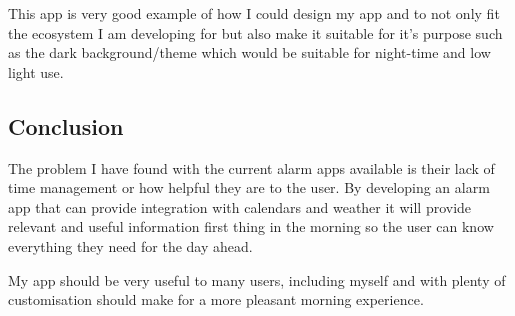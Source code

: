 This app is very good example of how I could design my app and to not
only fit the ecosystem I am developing for but also make it suitable for
it's purpose such as the dark background/theme which would be suitable
for night-time and low light use.

\subsection{Conclusion}\label{conclusion}

The problem I have found with the current alarm apps available is their
lack of time management or how helpful they are to the user. By
developing an alarm app that can provide integration with calendars and
weather it will provide relevant and useful information first thing in
the morning so the user can know everything they need for the day ahead.

My app should be very useful to many users, including myself and with
plenty of customisation should make for a more pleasant morning
experience.

